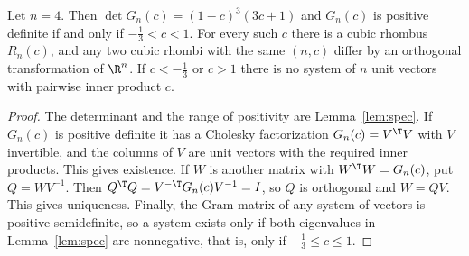 \begin{theorem}\label{thm:main}
Let $n=4$. Then $\det G_n(c)=\left(1 - c\right)^{3} \left(3 c + 1\right)$ and $G_n(c)$ is positive definite if and only if $- \frac{1}{3}<c<1$.
For every such $c$ there is a cubic rhombus $R_n(c)$, and any two cubic rhombi with the same $(n,c)$ differ by an orthogonal transformation of $\R^n$.
If $c<- \frac{1}{3}$ or $c>1$ there is no system of $n$ unit vectors with pairwise inner product $c$.
\end{theorem}
\begin{proof}
The determinant and the range of positivity are Lemma~\ref{lem:spec}.
If $G_n(c)$ is positive definite it has a Cholesky factorization $G_n(c)=V^\T V$ with $V$ invertible, and the columns of $V$ are unit vectors with the required inner products. This gives existence.
If $W$ is another matrix with $W^\T W=G_n(c)$, put $Q=WV^{-1}$. Then $Q^\T Q=V^{-\T}G_n(c)V^{-1}=I$, so $Q$ is orthogonal and $W=QV$. This gives uniqueness.
Finally, the Gram matrix of any system of vectors is positive semidefinite, so a system exists only if both eigenvalues in Lemma~\ref{lem:spec} are nonnegative, that is, only if $- \frac{1}{3}\le c\le1$.
\end{proof}
